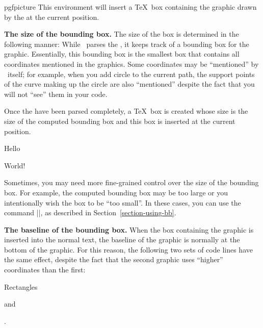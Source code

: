 \begin{environment}{{pgfpicture}}
    This environment will insert a \TeX\ box containing the graphic drawn by
    the  at the current position.


    \medskip
    \textbf{The size of the bounding box.}
    The size of the box is determined in the following manner: While \pgfname\
    parses the , it keeps track of a bounding box
    for the graphic. Essentially, this bounding box is the smallest box that
    contains all coordinates mentioned in the graphics. Some coordinates may be
    ``mentioned'' by \pgfname\ itself; for example, when you add circle to the
    current path, the support points of the curve making up the circle are also
    ``mentioned'' despite the fact that you will not ``see'' them in your code.

    Once the  have been parsed completely, a \TeX\
    box is created whose size is the size of the computed bounding box and this
    box is inserted at the current position.
\begin{codeexample}[pre={\begin{lateximage}},post={\end{lateximage}}]
Hello \begin{pgfpicture}
  \pgfpathrectangle{\pgfpointorigin}{\pgfpoint{2ex}{1ex}}
  \pgfusepath{stroke}
\end{pgfpicture} World!
\end{codeexample}

    Sometimes, you may need more fine-grained control over the size of the
    bounding box. For example, the computed bounding box may be too large or
    you intentionally wish the box to be ``too small''. In these cases, you can
    use the command |\pgfusepath{use as bounding box}|, as described in
    Section~\ref{section-using-bb}.


    \medskip
    \textbf{The baseline of the bounding box.}
    When the box containing the graphic is inserted into the normal text, the
    baseline of the graphic is normally at the bottom of the graphic. For this
    reason, the following two sets of code lines have the same effect, despite
    the fact that the second graphic uses ``higher'' coordinates than the
    first:
\begin{codeexample}[pre={\begin{lateximage}},post={\end{lateximage}}]
Rectangles \begin{pgfpicture}
  \pgfpathrectangle{\pgfpointorigin}{\pgfpoint{2ex}{1ex}}
\end{pgfpicture} and \begin{pgfpicture}
  \pgfpathrectangle{\pgfpoint{0ex}{1ex}}{\pgfpoint{2ex}{1ex}}
  \pgfusepath{stroke}
\end{pgfpicture}.
\end{codeexample}


\end{environment}
